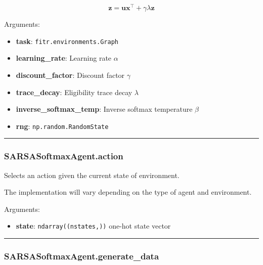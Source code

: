 \[
\mathbf z = \mathbf u \mathbf x^\top +  \gamma \lambda \mathbf z
\]

Arguments:

\begin{itemize}
\tightlist
\item
  \textbf{task}: \texttt{fitr.environments.Graph}
\item
  \textbf{learning\_rate}: Learning rate \(\alpha\)
\item
  \textbf{discount\_factor}: Discount factor \(\gamma\)
\item
  \textbf{trace\_decay}: Eligibility trace decay \(\lambda\)
\item
  \textbf{inverse\_softmax\_temp}: Inverse softmax temperature \(\beta\)
\item
  \textbf{rng}: \texttt{np.random.RandomState}
\end{itemize}

\begin{center}\rule{0.5\linewidth}{\linethickness}\end{center}

\subsubsection{SARSASoftmaxAgent.action}\label{sarsasoftmaxagent.action}

\begin{Shaded}
\begin{Highlighting}[]
\end{Highlighting}
\end{Shaded}

Selects an action given the current state of environment.

The implementation will vary depending on the type of agent and
environment.

Arguments:

\begin{itemize}
\tightlist
\item
  \textbf{state}: \texttt{ndarray((nstates,))} one-hot state vector
\end{itemize}

\begin{center}\rule{0.5\linewidth}{\linethickness}\end{center}

\subsubsection{SARSASoftmaxAgent.generate\_data}\label{sarsasoftmaxagent.generate_data}

